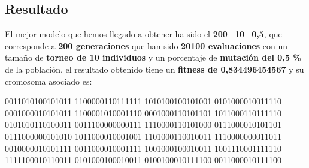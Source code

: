 \documentclass[12pt, spanish, pdftex]{UC3M_document}
\begin{document}
\subsection{Resultado}
El mejor modelo que hemos llegado a obtener ha sido el \textbf{200\_10\_0,5}, que corresponde a \textbf{200 generaciones} que han sido \textbf{20100 evaluaciones} con un tamaño de \textbf{torneo de 10 individuos} y un porcentaje de \textbf{mutación del 0,5 \%} de la población, el resultado obtenido tiene un \textbf{fitness de 0,834496454567} y su cromosoma asociado es:

0011010100101011 1100000110111111 1010100100101001 0101000010011110 0001000010101011 1100001010001110 0001000110101101 1011000110111110 0101010110100011 0011100000000111 1110000110101000 0111000010101101 0111000000101010 1011000010001001 1101000110010011 1110000000011011 0010000010101111 0011000010001111 1001000100010011 1001110001111110 1111100010110011 0101000100010011 0100100010111100 0011000010111100
\pagebreak
\end{document}
